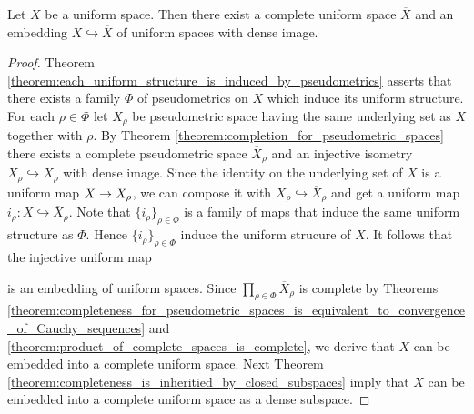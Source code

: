 \begin{theorem}\label{theorem:completion_for_uniform_spaces}
	Let $X$ be a uniform space. Then there exist a complete uniform space $\overline{X}$ and an embedding $X \hookrightarrow \overline{X}$ of uniform spaces with dense image.
\end{theorem}
\begin{proof}
	Theorem \ref{theorem:each_uniform_structure_is_induced_by_pseudometrics} asserts that there exists a family $\Phi$ of pseudometrics on $X$ which induce its uniform structure. For each $\rho \in \Phi$ let $X_{\rho}$ be pseudometric space having the same underlying set as $X$ together with $\rho$. By Theorem \ref{theorem:completion_for_pseudometric_spaces} there exists a complete pseudometric space $\overline{X}_{\rho}$ and an injective isometry $X_{\rho} \hookrightarrow \overline{X}_{\rho}$ with dense image. Since the identity on the underlying set of $X$ is a uniform map $X \rightarrow X_{\rho}$, we can compose it with $X_{\rho} \hookrightarrow \overline{X}_{\rho}$ and get a uniform map $i_{\rho}:X \hookrightarrow \overline{X}_{\rho}$. Note that $\{i_{\rho}\}_{\rho\in \Phi}$ is a family of maps that induce the same uniform structure as $\Phi$. Hence $\{i_{\rho}\}_{\rho \in \Phi}$ induce the uniform strucure of $X$. It follows that the injective uniform map
	\begin{center}
	\end{center}
	is an embedding of uniform spaces. Since $\prod_{\rho \in \Phi}\overline{X}_{\rho}$ is complete by Theorems \ref{theorem:completeness_for_pseudometric_spaces_is_equivalent_to_convergence_of_Cauchy_sequences} and \ref{theorem:product_of_complete_spaces_is_complete}, we derive that $X$ can be embedded into a complete uniform space. Next Theorem \ref{theorem:completeness_is_inheritied_by_closed_subspaces} imply that $X$ can be embedded into a complete uniform space as a dense subspace.
\end{proof}

